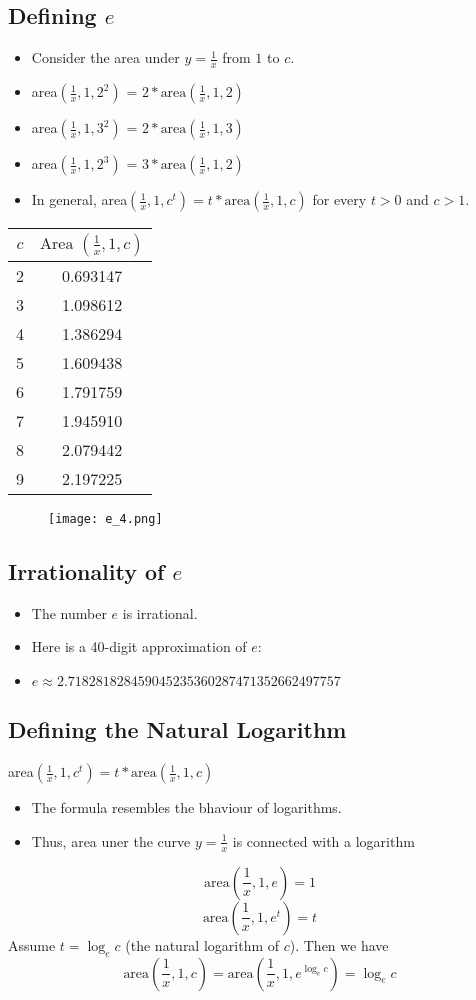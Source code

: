\subsection{Defining \(e\)}
\begin{itemize}
  \item Consider the area under \(y = \frac{1}{x}\) from \(1\) to \(c\).
  \item area\((\frac{1}{x},1,2^{2})\) = \(2*\text{area}(\frac{1}{x},1,2)\)
  \item area\((\frac{1}{x},1,3^{2})\) = \(2*\text{area}(\frac{1}{x},1,3)\)
  \item area\((\frac{1}{x},1,2^{3})\) = \(3*\text{area}(\frac{1}{x},1,2)\)
  \item In general, area\((\frac{1}{x},1,c^{t}) = t*\text{area}(\frac{1}{x},1,c)\) for every \(t>0\) and \(c>1\).
\end{itemize}
\begin{tabular}{|c|c|}
  \hline
  \( c \) & \( \text{Area }( \frac{1}{x},1, c )\) \\ \hline
  2 & 0.693147 \\
  3 & 1.098612 \\
  4 & 1.386294 \\
  5 & 1.609438 \\
  6 & 1.791759 \\
  7 & 1.945910 \\
  8 & 2.079442 \\
  9 & 2.197225 \\
  \hline
\end{tabular}

\begin{figure}
  \texttt{[image: e\_4.png]}
\end{figure}

\subsection{Irrationality of \(e\)}
\begin{itemize}
  \item The number \(e\) is irrational.
  \item Here is a 40-digit approximation of \(e\):
  \item \(e \approx 2.718281828459045235360287471352662497757\)
\end{itemize}

\subsection{Defining the Natural Logarithm}
area\((\frac{1}{x},1,c^{t}) = t*\text{area}(\frac{1}{x},1,c) \)
\begin{itemize}
  \item The formula resembles the bhaviour of logarithms.
  \item Thus, area uner the curve \(y = \frac{1}{x}\) is connected with a logarithm
\end{itemize}
\[\text{area}(\frac{1}{x},1,e) = 1 \]
\[\text{area}(\frac{1}{x},1,e^{t}) = t \]
Assume \(t = \log_e c\) (the natural logarithm of \(c\)). Then we have
\[\text{area}(\frac{1}{x},1,c) = \text{area}(\frac{1}{x},1,e^{\log_e c}) = \log_e c\]

